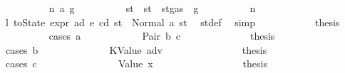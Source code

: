 \begin{isabellebody}
\ \ \ \ \ \ \ \ \isamarkupfalse%
\ {\isacharparenleft}{\kern0pt}n\ a{}\ g{\isacharprime}{\kern0pt}{\isacharparenright}{\kern0pt}\isanewline
\ \ \ \ \ \ \ \ \isamarkupfalse%
\ st{\isacharprime}{\kern0pt}{\isacharprime}{\kern0pt}\ \ {\isachardoublequoteopen}st{\isacharprime}{\kern0pt}{\isacharprime}{\kern0pt}\ {\isacharequal}{\kern0pt}\ st{\isacharprime}{\kern0pt}{\isasymlparr}gas\ {\isacharcolon}{\kern0pt}{\isacharequal}{\kern0pt}\ g{\isacharprime}{\kern0pt}{\isasymrparr}{\isachardoublequoteclose}\isanewline
\ \ \ \ \ \ \ \ \isamarkupfalse%
\ n\ \isamarkupfalse%
\ l{}{\isacharcolon}{\kern0pt}\ {\isachardoublequoteopen}toState\ {\isacharparenleft}{\kern0pt}expr\ ad\ e\ cd{\isacharparenright}{\kern0pt}\ st{\isacharprime}{\kern0pt}\ {\isacharequal}{\kern0pt}\ Normal\ {\isacharparenleft}{\kern0pt}a{}{\isacharcomma}{\kern0pt}\ st{\isacharprime}{\kern0pt}{\isacharprime}{\kern0pt}{\isacharparenright}{\kern0pt}{\isachardoublequoteclose}\ \isamarkupfalse%
\ st{\isacharprime}{\kern0pt}{\isacharunderscore}{\kern0pt}def\ \isamarkupfalse%
\ simp\isanewline
\ \ \ \ \ \ \ \ \isamarkupfalse%
\ \isamarkupfalse%
\ {\isacharquery}{\kern0pt}thesis\isanewline
\ \ \ \ \ \ \ \ \isamarkupfalse%
\ {\isacharparenleft}{\kern0pt}cases\ a{}{\isacharparenright}{\kern0pt}\isanewline
\ \ \ \ \ \ \ \ \ \ \isamarkupfalse%
\ {\isacharparenleft}{\kern0pt}Pair\ b\ c{\isacharparenright}{\kern0pt}\isanewline
\ \ \ \ \ \ \ \ \ \ \isamarkupfalse%
\ \isamarkupfalse%
\ {\isacharquery}{\kern0pt}thesis\isanewline
\ \ \ \ \ \ \ \ \ \ \isamarkupfalse%
\ {\isacharparenleft}{\kern0pt}cases\ b{\isacharparenright}{\kern0pt}\isanewline
\ \ \ \ \ \ \ \ \ \ \ \ \isamarkupfalse%
\ {\isacharparenleft}{\kern0pt}KValue\ adv{\isacharparenright}{\kern0pt}\isanewline
\ \ \ \ \ \ \ \ \ \ \ \ \isamarkupfalse%
\ \isamarkupfalse%
\ {\isacharquery}{\kern0pt}thesis\isanewline
\ \ \ \ \ \ \ \ \ \ \ \ \isamarkupfalse%
\ {\isacharparenleft}{\kern0pt}cases\ c{\isacharparenright}{\kern0pt}\isanewline
\ \ \ \ \ \ \ \ \ \ \ \ \ \ \isamarkupfalse%
\ {\isacharparenleft}{\kern0pt}Value\ x{}{\isacharparenright}{\kern0pt}\isanewline
\ \ \ \ \ \ \ \ \ \ \ \ \ \ \isamarkupfalse%
\ \isamarkupfalse%
\ {\isacharquery}{\kern0pt}thesis\isanewline

\end{isabellebody}
